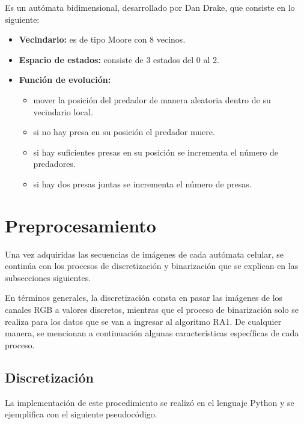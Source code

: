 Es un autómata bidimensional, desarrollado por Dan Drake, que consiste en lo siguiente:
\begin{itemize}
	\item \textbf{Vecindario:} es de tipo Moore con 8 vecinos.
	\item \textbf{Espacio de estados:} consiste de 3 estados del 0 al 2.
	\item \textbf{Función de evolución:} 
	\begin{itemize}
		\item mover la posición del predador de manera aleatoria dentro de su vecindario local.
		\item si no hay presa en su posición el predador muere.
		\item si hay suficientes presas en su posición se incrementa el número de predadores.
		\item si hay dos presas juntas se incrementa el número de presas.
	\end{itemize}
\end{itemize}

\section{Preprocesamiento}
Una vez adquiridas las secuencias de imágenes de cada autómata celular, se continúa con los procesos de discretización y binarización que se explican en las subsecciones siguientes.

En términos generales, la discretización consta en pasar las imágenes de los canales RGB a valores discretos, mientras que el proceso de binarización solo se realiza para los datos que se van a ingresar al algoritmo RA1. De cualquier manera, se mencionan a continuación algunas características específicas de cada proceso.

\subsection{Discretización}

La implementación de este procedimiento se realizó en el lenguaje Python y se ejemplifica con el siguiente pseudocódigo.

